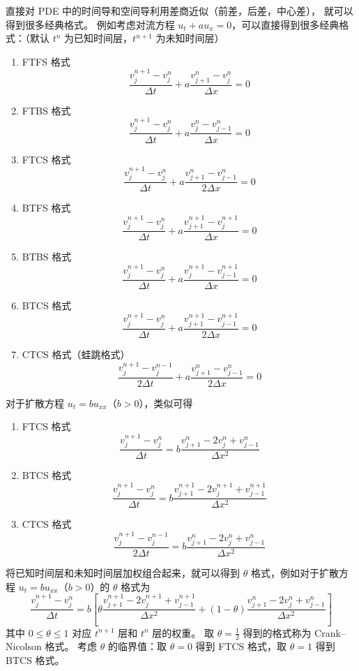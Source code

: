 直接对 PDE 中的时间导和空间导利用差商近似（前差，后差，中心差），
就可以得到很多经典格式。
例如考虑对流方程 $u_t + a u_x = 0$，可以直接得到很多经典格式：（默认 $t^n$ 为已知时间层，$t^{n+1}$ 为未知时间层）
\begin{enumerate}
    \item FTFS 格式
          \[
              \frac{v_{j}^{n+1} - v_{j}^n}{\Delta t} + a \frac{v_{j+1}^n - v_{j}^n}{\Delta x} = 0
          \]
    \item FTBS 格式
          \[
              \frac{v_{j}^{n+1} - v_{j}^n}{\Delta t} + a \frac{v_{j}^n - v_{j-1}^n}{\Delta x} = 0
          \]
    \item FTCS 格式
          \[
              \frac{v_{j}^{n+1} - v_{j}^n}{\Delta t} + a \frac{v_{j+1}^n - v_{j-1}^n}{2\Delta x} = 0
          \]
    \item BTFS 格式
          \[
              \frac{v_{j}^{n+1} - v_{j}^n}{\Delta t} + a \frac{v_{j+1}^{n+1} - v_{j}^{n+1}}{\Delta x} = 0
          \]
    \item BTBS 格式
          \[
              \frac{v_{j}^{n+1} - v_{j}^n}{\Delta t} + a \frac{v_{j}^{n+1} - v_{j-1}^{n+1}}{\Delta x} = 0
          \]
    \item BTCS 格式
          \[
              \frac{v_{j}^{n+1} - v_{j}^n}{\Delta t} + a \frac{v_{j+1}^{n+1} - v_{j-1}^{n+1}}{2\Delta x} = 0
          \]
    \item CTCS 格式（蛙跳格式）
          \[
              \frac{v_{j}^{n+1} - v_{j}^{n-1}}{2\Delta t} + a \frac{v_{j+1}^n - v_{j-1}^n}{2\Delta x} = 0
          \]
\end{enumerate}
对于扩散方程 $u_t = b u_{xx}$（$b>0$），类似可得
\begin{enumerate}
    \item FTCS 格式
          \[
              \frac{v_{j}^{n+1} - v_{j}^n}{\Delta t} = b \frac{v_{j+1}^n - 2v_{j}^n + v_{j-1}^n}{\Delta x^2}
          \]
    \item BTCS 格式
          \[
              \frac{v_{j}^{n+1} - v_{j}^n}{\Delta t} = b \frac{v_{j+1}^{n+1} - 2v_{j}^{n+1} + v_{j-1}^{n+1}}{\Delta x^2}
          \]
    \item CTCS 格式
          \[
              \frac{v_{j}^{n+1} - v_{j}^{n-1}}{2\Delta t} = b \frac{v_{j+1}^{n} - 2v_{j}^{n} + v_{j-1}^{n}}{\Delta x^2}
          \]
\end{enumerate}

将已知时间层和未知时间层加权组合起来，就可以得到 $\theta$ 格式，例如对于扩散方程 $u_t = b u_{xx}$（$b>0$）的 $\theta$ 格式为
\[
    \frac{v_{j}^{n+1} - v_{j}^n}{\Delta t}
    =
    b \left[
        \theta \frac{v_{j+1}^{n+1} - 2v_{j}^{n+1} + v_{j-1}^{n+1}}{\Delta x^2}
        + (1-\theta) \frac{v_{j+1}^n - 2v_{j}^n + v_{j-1}^n}{\Delta x^2}
        \right]
\]
其中 $0 \le \theta \le 1$ 对应 $t^{n+1}$ 层和 $t^n$ 层的权重。
取 $\theta = \frac12$ 得到的格式称为 Crank–Nicolson 格式。
考虑 $\theta$ 的临界值：取 $\theta = 0$ 得到 FTCS 格式，取 $\theta = 1$ 得到 BTCS 格式。


